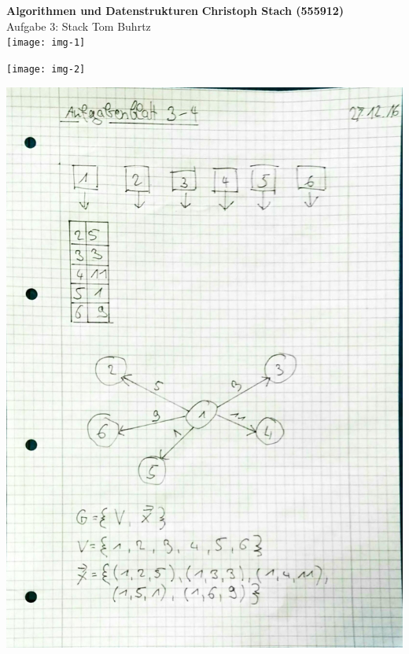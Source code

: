 \documentclass[a4paper, 11pt]{article}
\begin{document}
\noindent
\large\textbf{Algorithmen und Datenstrukturen} \hfill \textbf{Christoph Stach (555912)} \\
\normalsize Aufgabe 3: Stack \hfill Tom Buhrtz \\

\texttt{[image: img-1]}
\pagebreak

\texttt{[image: img-2]}
\pagebreak

\includegraphics[width=15cm]{img-3}
\pagebreak
\end{document}
